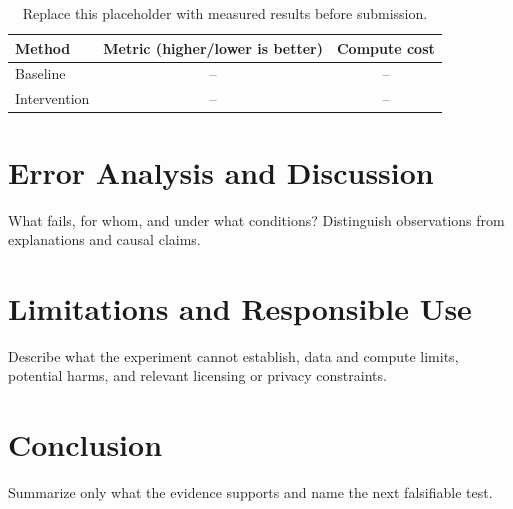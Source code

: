 \documentclass[11pt]{article}
\begin{document}
\begin{table}[ht]
  \centering
  \caption{Replace this placeholder with measured results before submission.}
  \label{tab:results}
  \begin{tabular}{lcc}
    \toprule
    Method & Metric (higher/lower is better) & Compute cost \\
    \midrule
    Baseline & -- & -- \\
    Intervention & -- & -- \\
    \bottomrule
  \end{tabular}
\end{table}

\section{Error Analysis and Discussion}
What fails, for whom, and under what conditions? Distinguish observations
from explanations and causal claims.

\section{Limitations and Responsible Use}
Describe what the experiment cannot establish, data and compute limits,
potential harms, and relevant licensing or privacy constraints.

\section{Conclusion}
Summarize only what the evidence supports and name the next falsifiable test.



\end{document}
